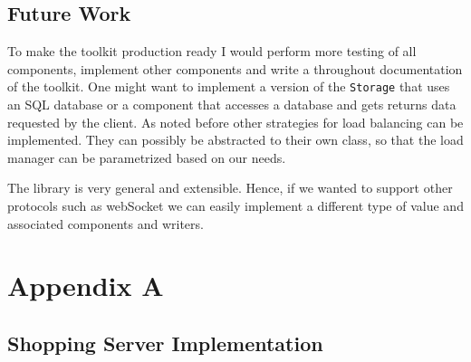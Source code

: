 \documentclass[12pt,a4paper]{article}
\begin{document}
\subsection{Future Work}
To make the toolkit production ready I would perform more testing of all
components, implement other components and write a throughout documentation
of the toolkit. One might want to implement a version of the \texttt{Storage}
that uses an SQL database or a component that accesses a database and 
gets returns data requested by the client. As noted before other strategies 
for load balancing can be implemented.
They can possibly be abstracted to their own class, so that the
load manager can be parametrized based on our needs.  

The library is very general and extensible. Hence, if we wanted to support 
other protocols such as webSocket we can easily implement a different 
type of value and associated components and writers. 

\newpage
\printbibliography[
    heading=bibintoc,
    title={References}
]

\newpage
\section*{Appendix A}
\subsection*{Shopping Server Implementation}

\end{document}
